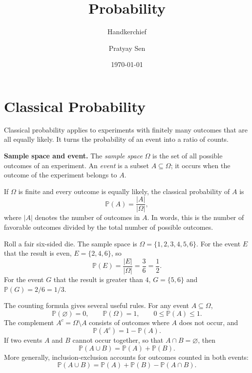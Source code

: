 \documentclass[a4paper,11pt,abstracton]{scrartcl}
\theoremstyle{dotlessP}
\theoremstyle{dotlessS}
\theoremstyle{remark}
\theoremstyle{definition}
\begin{document}

\title{Probability}
\subtitle{Handkerchief}
\author{Pratyay Sen}
\date{\today}
\maketitle

\tableofcontents

\eject



\section{Classical Probability}

Classical probability applies to experiments with finitely many outcomes that are all equally likely. It turns the probability of an event into a ratio of counts.

\begin{definition_box}
\textbf{Sample space and event.} The \emph{sample space} $\Omega$ is the set of all possible outcomes of an experiment. An \emph{event} is a subset $A\subseteq\Omega$; it occurs when the outcome of the experiment belongs to $A$.

If $\Omega$ is finite and every outcome is equally likely, the classical probability of $A$ is
\[
  \mathbb{P}(A)=\frac{|A|}{|\Omega|},
\]
where $|A|$ denotes the number of outcomes in $A$. In words, this is the number of favorable outcomes divided by the total number of possible outcomes.
\end{definition_box}

\begin{example_box}
Roll a fair six-sided die. The sample space is $\Omega=\{1,2,3,4,5,6\}$. For the event $E$ that the result is even, $E=\{2,4,6\}$, so
\[
  \mathbb{P}(E)=\frac{|E|}{|\Omega|}=\frac{3}{6}=\frac{1}{2}.
\]
For the event $G$ that the result is greater than $4$, $G=\{5,6\}$ and $\mathbb{P}(G)=2/6=1/3$.
\end{example_box}

The counting formula gives several useful rules. For any event $A\subseteq\Omega$,
\[
  \mathbb{P}(\varnothing)=0, \qquad \mathbb{P}(\Omega)=1,
  \qquad 0\leq \mathbb{P}(A)\leq 1.
\]
The complement $A^c=\Omega\setminus A$ consists of outcomes where $A$ does not occur, and
\[
  \mathbb{P}(A^c)=1-\mathbb{P}(A).
\]
If two events $A$ and $B$ cannot occur together, so that $A\cap B=\varnothing$, then
\[
  \mathbb{P}(A\cup B)=\mathbb{P}(A)+\mathbb{P}(B).
\]
More generally, inclusion-exclusion accounts for outcomes counted in both events:
\[
  \mathbb{P}(A\cup B)=\mathbb{P}(A)+\mathbb{P}(B)-\mathbb{P}(A\cap B).
\]
\end{document}
